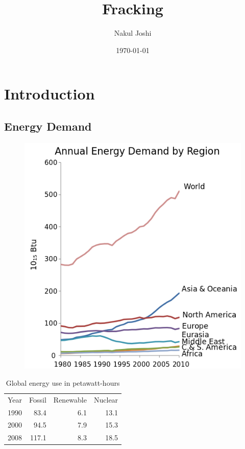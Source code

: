 \documentclass[pdf]{beamer}
\title{Fracking}
\author{Nakul Joshi}
\date{\today}
\begin{document}
\begin{frame}
\titlepage
\end{frame}




\section{Introduction}

	\subsection{Energy Demand}\begin{frame}
		\begin{multicols}{2}
		\begin{figure}
			\includegraphics[scale=0.23]{graph.png}
		\end{figure}
		
		\begin{table}\begin{tabular}{lrrr}
			Year & Fossil & Renewable & Nuclear \\
			1990 & 83.4   & 6.1       & 13.1    \\
			2000 & 94.5   & 7.9       & 15.3    \\
			2008 & 117.1  & 8.3       & 18.5    \\
			\end{tabular}
			\caption {Global energy use in petawatt-hours}
		\end{table}
		\end{multicols}
	\end{frame}
	
\end{document}
